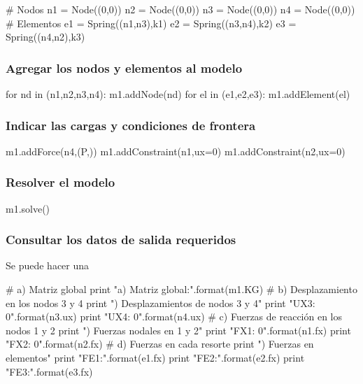 \begin{python}
# Nodos
n1 = Node((0,0))
n2 = Node((0,0))
n3 = Node((0,0))
n4 = Node((0,0))
# Elementos
e1 = Spring((n1,n3),k1)
e2 = Spring((n3,n4),k2)
e3 = Spring((n4,n2),k3)
\end{python}


\subsubsection*{Agregar los nodos y elementos al modelo}

\begin{python}
    for nd in (n1,n2,n3,n4):
        m1.addNode(nd)
    for el in (e1,e2,e3):
        m1.addElement(el)
\end{python}

\subsubsection*{Indicar las cargas y condiciones de frontera}

\begin{python}
    m1.addForce(n4,(P,))
    m1.addConstraint(n1,ux=0)
    m1.addConstraint(n2,ux=0)
\end{python}

\subsubsection*{Resolver el modelo}

\begin{python}
    m1.solve()
\end{python}


\subsubsection*{Consultar los datos de salida requeridos}

Se puede hacer una

\begin{python}
# a) Matriz global
print "a) Matriz global:".format(m1.KG)
# b) Desplazamiento en los nodos 3 y 4
print "\nb) Desplazamientos de nodos 3 y 4"
print "UX3: {0}".format(n3.ux)
print "UX4: {0}".format(n4.ux)
# c) Fuerzas de reacción en los nodos 1 y 2
print "\nc) Fuerzas nodales en 1 y 2"
print "FX1: {0}".format(n1.fx)
print "FX2: {0}".format(n2.fx)
# d) Fuerzas en cada resorte
print "\nd) Fuerzas en elementos"
print "FE1:".format(e1.fx)
print "FE2:".format(e2.fx)
print "FE3:".format(e3.fx)
\end{python}


